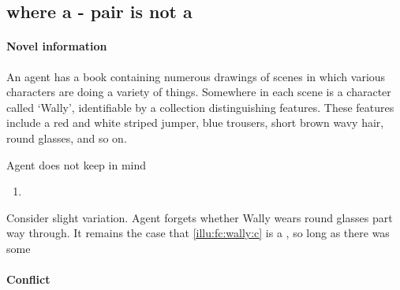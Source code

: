 \subsection{ where a - pair is not a \fc{}}

\paragraph*{Novel information}

\begin{note}
  \begin{scenario}
    \label{illu:fc:wally}
    An agent has a book containing numerous drawings of scenes in which various characters are doing a variety of things.
    Somewhere in each scene is a character called `Wally', identifiable by a collection distinguishing features.
    These features include a red and white striped jumper, blue trousers, short brown wavy hair, round glasses, and so on.
  \end{scenario}

  Agent does not keep in mind 

  \begin{enumerate}[label=C\thescenarioCounter., ref=(C\thescenarioCounter)]
  \item
    \label{illu:fc:wally:c}
  \end{enumerate}

  Consider slight variation.
  Agent forgets whether Wally wears round glasses part way through.
  It remains the case that \ref{illu:fc:wally:c} is a \fc{}, so long as there was some 
\end{note}

\paragraph*{Conflict}

